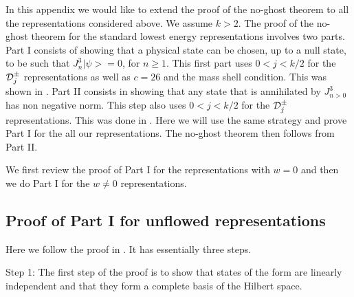 In this appendix we would like to extend the proof of the no-ghost theorem
to all the representations considered above. We assume $k>2$.
The proof of the no-ghost theorem for the standard lowest energy
representations \cite{Balog:1989jb,Petropoulos:1990fc,Mohammedi:1990dp,%
Bars:1991rb,Hwang:1991aq,Hwang:1992an,Hwang:1998tr,Evans:1998qu,Dixon:1989cg}
 involves two parts. 
Part I consists of  showing
 that a physical state can be chosen, up to a null state,
to be such that $J^3_n |\psi> =0$, for $n \geq 1$. This first part 
uses $0<j<k/2$ for the ${\cal D}^{\pm}_j$ representations as
well as $c=26$ and the mass shell condition. This was shown in 
\cite{Balog:1989jb,Petropoulos:1990fc,Mohammedi:1990dp,Bars:1991rb,%
Hwang:1991aq,Hwang:1992an,Hwang:1998tr,Evans:1998qu}.
Part II consists in showing that any state that is annihilated by
$J^3_{n>0}$ has non negative norm.  This step also uses $0<j<k/2$ for
the ${\cal D}^\pm_j$ representations. This was done in \cite{Dixon:1989cg}.
Here we will use the same strategy and prove Part I for the 
all our representations. The no-ghost theorem then follows from Part II.

\medskip

We first review the proof of Part I for the representations with $w=0$ and
then we do Part I for the $w \not =0$ representations. 


 
\subsection{Proof of Part I for unflowed representations}


Here we follow the proof in \cite{Balog:1989jb,Petropoulos:1990fc,%
Hwang:1991aq,Hwang:1992an,Evans:1998qu}.
It has essentially three steps.


\medskip

\noindent
Step 1: The first step of the proof is to show 
 that states of the form
{} 
are linearly independent 
 and that they form a complete basis of the Hilbert
space. 


